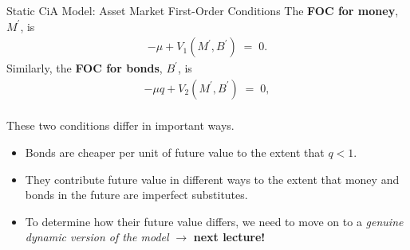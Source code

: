 \documentclass[10pt,c,aspectratio=1610,handout]{beamer}
\begin{document}
\begin{frame}{Static CiA Model: Asset Market First-Order Conditions}%
  The \textbf{FOC for money}, $M^{\prime}$, is%
  \begin{align*}%
    -\mu + V_{1}(M^{\prime}, B^{\prime}) \; = \; 0.%
  \end{align*}%
  \pause%
  Similarly, the \textbf{FOC for bonds}, $B^{\prime}$, is%
  \begin{align*}%
    -\mu q + V_{2}(M^{\prime}, B^{\prime}) \; = \; 0,%
  \end{align*}%
  \medskip\\%
  \pause%
  These two conditions differ in important ways.%
  \begin{itemize}%
    \item[$\blacktriangleright$] Bonds are cheaper per unit of future value to the extent that $q<1.$%
    \item[$\blacktriangleright$] They contribute future value in different ways to the extent that money and bonds in the future are imperfect substitutes.%
    \item[$\blacktriangleright$] To determine how their future value differs, we need to move on to a \emph{genuine dynamic version of the model} $\rightarrow$ \textbf{next lecture!}%
  \end{itemize}%
\end{frame}%
\end{document}
